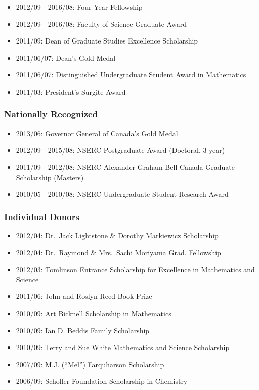 \documentclass[]{article}
\providecommand{\tightlist}{%
  \setlength{\itemsep}{0pt}\setlength{\parskip}{0pt}}
\begin{document}
\begin{itemize}
\tightlist
\item
  2012/09 - 2016/08: Four-Year Fellowship
\item
  2012/09 - 2016/08: Faculty of Science Graduate Award
\item
  2011/09: Dean of Graduate Studies Excellence Scholarship
\item
  2011/06/07: Dean's Gold Medal
\item
  2011/06/07: Distinguished Undergraduate Student Award in Mathematics
\item
  2011/03: President's Surgite Award
\end{itemize}

\hypertarget{nationally-recognized}{%
\subsubsection{Nationally Recognized}\label{nationally-recognized}}

\begin{itemize}
\tightlist
\item
  2013/06: Governor General of Canada's Gold Medal
\item
  2012/09 - 2015/08: NSERC Postgraduate Award (Doctoral, 3-year)
\item
  2011/09 - 2012/08: NSERC Alexander Graham Bell Canada Graduate Scholarship (Masters)
\item
  2010/05 - 2010/08: NSERC Undergraduate Student Research Award
\end{itemize}

\hypertarget{individual-donors}{%
\subsubsection{Individual Donors}\label{individual-donors}}

\begin{itemize}
\tightlist
\item
  2012/04: Dr.~Jack Lightstone \& Dorothy Markiewicz Scholarship
\item
  2012/04: Dr.~Raymond \& Mrs.~Sachi Moriyama Grad. Fellowship
\item
  2012/03: Tomlinson Entrance Scholarship for Excellence in Mathematics and Science
\item
  2011/06: John and Roslyn Reed Book Prize
\item
  2010/09: Art Bicknell Scholarship in Mathematics
\item
  2010/09: Ian D. Beddis Family Scholarship
\item
  2010/09: Terry and Sue White Mathematics and Science Scholarship
\item
  2007/09: M.J. (``Mel'') Farquharson Scholarship
\item
  2006/09: Scholler Foundation Scholarship in Chemistry
\end{itemize}
\end{document}
